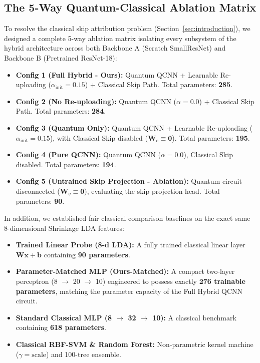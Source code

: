 \documentclass[10pt,twocolumn,twoside,a4paper]{article}
\begin{document}
\subsection{The 5-Way Quantum-Classical Ablation Matrix}
To resolve the classical skip attribution problem (Section~\ref{sec:introduction}), we designed a complete 5-way ablation matrix isolating every subsystem of the hybrid architecture across both Backbone A (Scratch SmallResNet) and Backbone B (Pretrained ResNet-18):
\begin{itemize}
    \item \textbf{Config 1 (Full Hybrid - Ours):} Quantum QCNN + Learnable Re-uploading ($\alpha_{\text{init}} = 0.15$) + Classical Skip Path. Total parameters: \textbf{285}.
    \item \textbf{Config 2 (No Re-uploading):} Quantum QCNN ($\alpha = 0.0$) + Classical Skip Path. Total parameters: \textbf{284}.
    \item \textbf{Config 3 (Quantum Only):} Quantum QCNN + Learnable Re-uploading ($\alpha_{\text{init}} = 0.15$), with Classical Skip disabled ($\mathbf{W}_c \equiv \mathbf{0}$). Total parameters: \textbf{195}.
    \item \textbf{Config 4 (Pure QCNN):} Quantum QCNN ($\alpha = 0.0$), Classical Skip disabled. Total parameters: \textbf{194}.
    \item \textbf{Config 5 (Untrained Skip Projection - Ablation):} Quantum circuit disconnected ($\mathbf{W}_q \equiv \mathbf{0}$), evaluating the skip projection head. Total parameters: \textbf{90}.
\end{itemize}

In addition, we established fair classical comparison baselines on the exact same 8-dimensional Shrinkage LDA features:
\begin{itemize}
    \item \textbf{Trained Linear Probe (8-d LDA):} A fully trained classical linear layer $\mathbf{W} \mathbf{x} + \mathbf{b}$ containing \textbf{90 parameters}.
    \item \textbf{Parameter-Matched MLP (Ours-Matched):} A compact two-layer perceptron (8 $\to$ 20 $\to$ 10) engineered to possess exactly \textbf{276 trainable parameters}, matching the parameter capacity of the Full Hybrid QCNN circuit.
    \item \textbf{Standard Classical MLP (8 $\to$ 32 $\to$ 10):} A classical benchmark containing \textbf{618 parameters}.
    \item \textbf{Classical RBF-SVM \& Random Forest:} Non-parametric kernel machine ($\gamma = \text{scale}$) and 100-tree ensemble.
\end{itemize}
\end{document}
